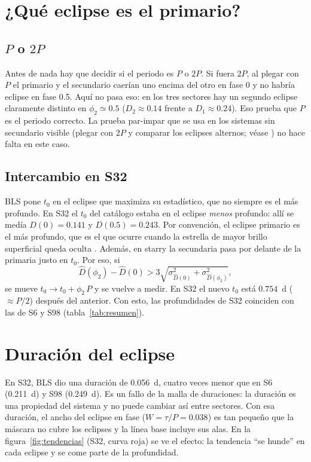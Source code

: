 \documentclass[11pt,a4paper]{article}
\begin{document}
\section{¿Qué eclipse es el primario?}
\label{sec:primario}

\subsection{$P$ o $2P$}
Antes de nada hay que decidir si el periodo es $P$ o $2P$. Si fuera $2P$, al plegar con $P$ el
primario y el secundario caerían uno encima del otro en fase 0 y no habría eclipse en fase 0.5.
Aquí no pasa eso: en los tres sectores hay un segundo eclipse claramente distinto en
$\phi_2\simeq0.5$ ($D_2\approx0.14$ frente a $D_1\approx0.24$). Eso prueba que $P$ es el periodo
correcto. La prueba par-impar que se usa en los sistemas sin secundario visible (plegar con $2P$
y comparar los eclipses alternos; véase \citealt{Thompson2018,Prsa2022}) no hace falta en este caso.

\subsection{Intercambio en S32}
BLS pone $t_0$ en el eclipse que maximiza su estadístico, que no siempre es el más profundo. En
S32 el $t_0$ del catálogo estaba en el eclipse \emph{menos} profundo: allí se medía
$D(0)=0.141$ y $D(0.5)=0.243$. Por convención, el eclipse primario es el más profundo, que es el
que ocurre cuando la estrella de mayor brillo superficial queda oculta \citep{Hilditch2001}. Además, en starry la
secundaria pasa por delante de la primaria justo en $t_0$. Por eso, si
\begin{equation}
\hat D(\phi_2)-\hat D(0) > 3\sqrt{\sigma^2_{\hat D(0)}+\sigma^2_{\hat D(\phi_2)}},
\end{equation}
se mueve $t_0\to t_0+\phi_2\,P$ y se vuelve a medir. En S32 el nuevo $t_0$ está $0.754$~d
($\approx P/2$) después del anterior. Con esto, las profundidades de S32 coinciden con las de S6
y S98 (tabla~\ref{tab:resumen}).

\section{Duración del eclipse}
\label{sec:duracion}
En S32, BLS dio una duración de 0.056~d, cuatro veces menor que en S6 (0.211~d) y S98 (0.249~d).
Es un fallo de la malla de duraciones: la duración es una propiedad del sistema y no puede cambiar
así entre sectores. Con esa duración, el ancho del eclipse en fase ($W=\tau/P=0.038$) es tan
pequeño que la máscara no cubre los eclipses y la línea base incluye sus alas. En la figura~\ref{fig:tendencias}
(S32, curva roja) se ve el efecto: la tendencia ``se hunde'' en cada eclipse y se come parte de la
profundidad.
\end{document}
